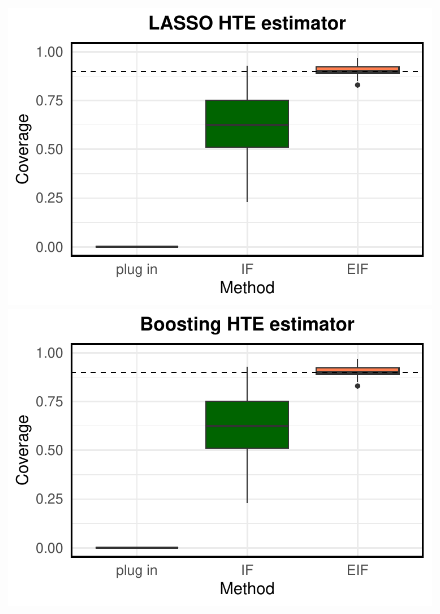 \documentclass{article}
\theoremstyle{plain}
\theoremstyle{definition}
\theoremstyle{plain}
\begin{document}
\begin{figure}[h]
        \centering
        \begin{minipage}{0.3\textwidth}
                \centering
                \includegraphics[clip, trim = 0cm 0cm 0cm 0cm, width = \textwidth]{plot/simulation_true_coverage_LASSO.pdf}
        \end{minipage}
        \begin{minipage}{0.3\textwidth}
                \centering
                \includegraphics[clip, trim = 0cm 0cm 0cm 0cm, width = \textwidth]{plot/simulation_true_coverage_Boosting.pdf}
        \end{minipage}
        \begin{minipage}{0.3\textwidth}
                \centering

\end{minipage}
\end{figure}
\end{document}
